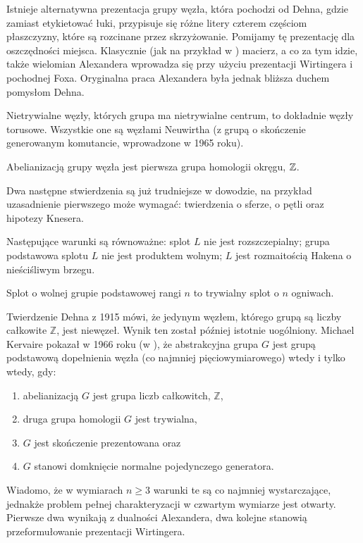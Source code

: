 Istnieje alternatywna prezentacja grupy węzła, która pochodzi od Dehna,
gdzie zamiast etykietować łuki,
przypisuje się różne litery czterem częściom płaszczyzny,
które są rozcinane przez skrzyżowanie.
Pomijamy tę prezentację dla oszczędności miejsca.
Klasycznie (jak na przykład w \cite{crowell63}) macierz, a co za tym idzie,
także wielomian Alexandera wprowadza się przy użyciu prezentacji Wirtingera i pochodnej Foxa.
Oryginalna praca Alexandera była jednak bliższa duchem pomysłom Dehna.

Nietrywialne węzły, których grupa ma nietrywialne centrum, to dokładnie węzły torusowe.
Wszystkie one są węzłami Neuwirtha
(z grupą o skończenie generowanym komutancie, wprowadzone w 1965 roku).

\begin{corollary}
    \label{prop:knot_group_abelianisation}
    Abelianizacją grupy węzła jest pierwsza grupa homologii okręgu, $\mathbb Z$.
\end{corollary}

Dwa następne stwierdzenia są już trudniejsze w dowodzie,
na przykład uzasadnienie pierwszego może wymagać:
twierdzenia o sferze, o pętli oraz hipotezy Knesera.

\begin{proposition}
    \label{prop:knot_group_split}
    Następujące warunki są równoważne:
    splot $L$ nie jest rozszczepialny;
    grupa podstawowa splotu $L$ nie jest produktem wolnym;
    $L$ jest rozmaitością Hakena o nieściśliwym brzegu.
\end{proposition}

\begin{proposition}
    \label{prop:knot_group_free}
    Splot o wolnej grupie podstawowej rangi $n$ to trywialny splot o $n$ ogniwach.
\end{proposition}

Twierdzenie Dehna z 1915 mówi, że jedynym węzłem,
którego grupą są liczby całkowite $\mathbb Z$, jest niewęzeł.
Wynik ten został później istotnie uogólniony.
Michael Kervaire pokazał w 1966 roku (w \cite{kervaire65}),
że abstrakcyjna grupa $G$ jest grupą podstawową dopełnienia węzła
(co najmniej pięciowymiarowego) wtedy i tylko wtedy, gdy:
\begin{enumerate}[leftmargin=*]
    \itemsep0em
    \item abelianizacją $G$ jest grupa liczb całkowitch, $\mathbb Z$,
    \item druga grupa homologii $G$ jest trywialna,
    \item $G$ jest skończenie prezentowana oraz
    \item $G$ stanowi domknięcie normalne pojedynczego generatora.
\end{enumerate}

Wiadomo, że w wymiarach $n \ge 3$ warunki te są co najmniej wystarczające,
jednakże problem  pełnej charakteryzacji w czwartym wymiarze jest otwarty.
Pierwsze dwa wynikają z dualności Alexandera,
dwa kolejne stanowią przeformułowanie prezentacji Wirtingera.

